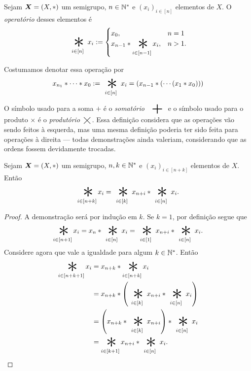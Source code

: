 \begin{definition}
Sejam $\bm X=(X,\ast)$ um semigrupo, $n \in \mathbb{N}^*$ e $(x_i)_{i \in [n]}$ elementos de $X$. O \emph{operatório} desses elementos é
	\begin{equation*}
	\bigopb _{i \in [n]} x_i :=
		\begin{cases}
		x_0, & n=1\\
		x_{n-1} \opb \displaystyle \bigopb_{i \in [n-1]} x_i, & n>1.
		\end{cases}
	\end{equation*}
\end{definition}

\begin{notation}
Costumamos denotar essa operação por
	\begin{equation*}
	x_{n_1} \opb \cdots \opb x_0 := \bigopb_{i \in [n]} x_i = (x_{n-1} \opb ( \cdots (x_1 \opb x_0)))
	\end{equation*}
\end{notation}

O símbolo usado para a soma $+$ é o \emph{somatório} $\displaystyle\bigplus$ e o símbolo usado para o produto $\times$ é o \emph{produtório} $\displaystyle\bigtimes$. Essa definição considera que as operações vão sendo feitos à esquerda, mas uma mesma definição poderia ter sido feita para operações à direita --- todas demonstrações ainda valeriam, considerando que as ordens fossem devidamente trocadas.

\begin{proposition}
Sejam $\bm X=(X,\ast)$ um semigrupo, $n,k \in \mathbb{N}^*$ e $(x_i)_{i \in [n+k]}$ elementos de $X$. Então
	\begin{equation*}
	\bigopb_{i \in [n+k]} x_i = \bigopb_{i \in [k]} x_{n+i} \opb \bigopb_{i \in [n]} x_i.
	\end{equation*}
\end{proposition}
\begin{proof}
A demonstração será por indução em $k$. Se $k=1$, por definição segue que
	\begin{equation*}
	\bigopb_{i \in [n+1]} x_i = x_{n} \opb \displaystyle \bigopb_{i \in [n]} x_i = \bigopb_{i \in [1]} x_{n+i} \opb \bigopb_{i \in [n]} x_i.
	\end{equation*}
Considere agora que vale a igualdade para algum $k \in \mathbb{N}^*$. Então
	\begin{align*}
	\bigopb_{i \in [n+k+1]} x_i
		&= x_{n+k} \opb \bigopb_{i \in [n+k]} x_i \\
		&= x_{n+k} \opb \left(\bigopb_{i \in [k]} x_{n+i} \opb \bigopb_{i \in [n]} x_i\right) \\
		&= \left(x_{n+k} \opb \bigopb_{i \in [k]} x_{n+i} \right) \opb \bigopb_{i \in [n]} x_i \\
		&= \bigopb_{i \in [k+1]} x_{n+i} \opb \bigopb_{i \in [n]} x_i. \qedhere
	\end{align*}
\end{proof}

